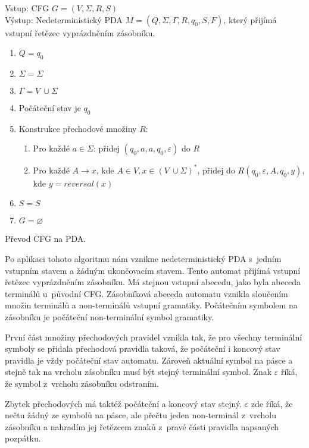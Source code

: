 \begin{framed}
	Vstup: CFG \(G = (V,\Sigma, R, S) \)\\
	Výstup: Nedeterministický PDA \(M = (Q, \Sigma, \Gamma, R, q_0, S, F) \), který přijímá vstupní řetězec vyprázdněním zásobníku. 
	\begin{enumerate}
		\item \(Q = {q_0}\)
		\item \(\Sigma = \Sigma\)
		\item \(\Gamma = V~\cup \Sigma \)
		\item Počáteční stav je \(q_0\)
		\item Konstrukce přechodové množiny \( R \):
		\begin{enumerate}
			\item Pro každé $a \in \Sigma$: přidej $(q_0,a,a,q_0,\varepsilon)$ do $R$
			\item Pro každé $A \rightarrow x$, kde $A \in V, x \in (V~\cup \Sigma)^*$, přidej do $R (q_0, \varepsilon, A, q_0, y)$, 
			kde $y = reversal(x)$
		\end{enumerate}
		\item \(S = S\)
		\item $G = \varnothing$
	\end{enumerate}
\end{framed}
\begin{myAlgorithm}
	Převod CFG na PDA.
\end{myAlgorithm}

Po aplikaci tohoto algoritmu nám vznikne nedeterministický PDA s~jedním vstupním stavem a žádným ukončovacím stavem. Tento automat přijímá vstupní řetězec vyprázdněním zásobníku. Má stejnou vstupní abecedu, jako byla abeceda terminálů u~původní CFG. Zásobníková abeceda automatu vznikla sloučením množin terminálů a non-terminálů vstupní gramatiky. Počátečním symbolem na zásobníku je počáteční non-terminální symbol gramatiky. 

První část množiny přechodových pravidel vznikla tak, že pro všechny terminální symboly se přidala přechodová pravidla taková, že počáteční i koncový stav pravidla je vždy počáteční stav automatu. Zároveň aktuální symbol na pásce a stejně tak na vrcholu zásobníku musí být stejný terminální symbol. Znak $\varepsilon$ říká, že symbol z~vrcholu zásobníku odstraním. 

Zbytek přechodových má taktéž počáteční a koncový stav stejný. $\varepsilon$ zde říká, že nečtu žádný ze symbolů na pásce, ale přečtu jeden non-terminál z~vrcholu zásobníku a nahradím jej řetězcem znaků z~pravé části pravidla napsaných pozpátku.  

